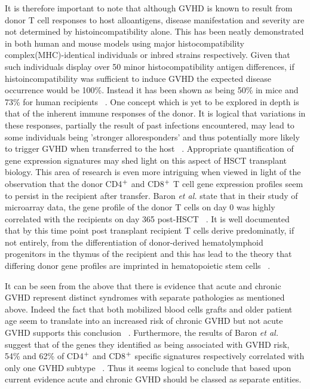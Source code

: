 It is therefore important to note that although GVHD is known to result from donor T cell responses to host alloantigens, disease manifestation and severity are not determined by histoincompatibility alone. This has been neatly demonstrated in both human and mouse models using major histocompatibility complex(MHC)-identical individuals or inbred strains respectively. Given that such individuals display over 50 minor histocompatibility antigen differences, if histoincompatibility was sufficient to induce GVHD the expected disease occurrence would be 100\%.  Instead it has been shown as being 50\% in mice and 73\% for human recipients ~\autocite{Bar2007}. One concept which is yet to be explored in depth is that of the inherent immune responses of the donor. It is logical that variations in these responses, partially the result of past infections encountered, may lead to some individuals being 'stronger alloresponders' and thus potentially more likely to trigger GVHD when transferred to the host ~\autocite{Bar2007}. Appropriate quantification of gene expression signatures may shed light on this aspect of HSCT transplant biology.  This area of research is even more intriguing when viewed in light of the observation that the donor CD4$\textsuperscript{+}$ and CD8$\textsuperscript{+}$ T cell gene expression profiles seem to persist in the recipient after transfer. Baron \textit{et al.} state that in their study of microarray data, the gene profile of the donor T cells on day 0 was highly correlated with the recipients on day 365 post-HSCT ~\autocite{Bar2007}. It is well documented that by this time point post transplant recipient T cells derive predominatly, if not entirely, from the differentiation of donor-derived hematolymphoid progenitors in the thymus of the recipient and this has lead to the theory that differing donor gene profiles are imprinted in hematopoietic stem cells ~\autocite{Bar2007}.

It can be seen from the above that there is evidence that acute and chronic GVHD represent distinct syndromes with separate pathologies as mentioned above. Indeed the fact that both mobilized blood cells grafts and older patient age seem to translate into an increased risk of chronic GVHD but not acute GVHD supports this conclusion ~\autocite{Flo2011}. Furthermore, the results of Baron \textit{et al.} suggest that of the genes they identified as being associated with GVHD risk, 54\% and 62\% of CD4$\textsuperscript{+}$ and CD8$\textsuperscript{+}$ specific signatures respectively correlated with only one GVHD subtype ~\autocite{Bar2007}. Thus it seems logical to conclude that based upon current evidence acute and chronic GVHD should be classed as separate entities. 


